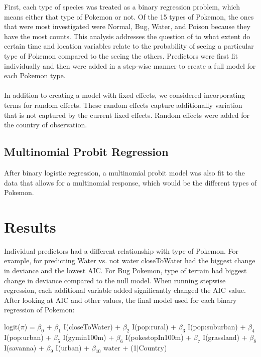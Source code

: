 \documentclass{article}
\begin{document}
First, each type of species was treated as a binary regression problem, which means either that type of Pokemon or not. Of the 15 types of Pokemon, the ones that were most investigated were Normal, Bug, Water, and Poison because they have the most counts. This analysis addresses the question of to what extent do certain time and location variables relate to the probability of seeing a particular type of Pokemon compared to the seeing the others. Predictors were first fit individually and then were added in a step-wise manner to create a full model for each Pokemon type. \\ 
\\ 
In addition to creating a model with fixed effects, we considered incorporating terms for random effects. These random effects capture additionally variation that is not captured by the current fixed effects. Random effects were added for the country of observation. 

\subsection{Multinomial Probit Regression}

After binary logistic regression, a multinomial probit model was also fit to the data that allows for a multinomial response, which would be the different types of Pokemon.

\section{Results}
Individual predictors had a different relationship with type of Pokemon. For example, for predicting Water vs. not water closeToWater had the biggest change in deviance and the lowest AIC. For Bug Pokemon, type of terrain had biggest change in deviance compared to the null model. When running stepwise regression, each additional variable added significantly changed the AIC value. After looking at AIC and other values, the final model used for each binary regression of Pokemon:

\begin{center}
logit($\pi$) = $\beta_0$ + $\beta_1$ I(closeToWater) + $\beta_2$ I(pop:rural) + $\beta_3$ I(pop:suburban) + $\beta_4$ I(pop:urban) + $\beta_5$ I(gymin100m) + $\beta_6$ I(pokestopIn100m) + $\beta_7$ I(grassland) + $\beta_8$ I(savanna) + $\beta_9$ I(urban) + $\beta_{10}$ water + (1$|$Country)
\end{center}
\end{document}
